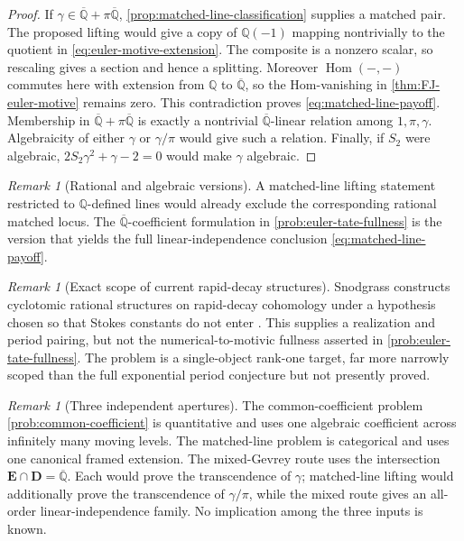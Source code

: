 \documentclass[11pt]{article}
\theoremstyle{keio}
\theoremstyle{definition}
\theoremstyle{remark}
\newtheorem{remark}[theorem]{Remark}
\newcommand{\Q}{\mathbb Q}
\newcommand{\Qbar}{\overline{\mathbb Q}}
\begin{document}
\begin{proof}
If \(\gamma\in\Qbar+\pi\Qbar\),
\cref{prop:matched-line-classification} supplies a matched pair.  The
proposed lifting would give a copy of \(\Q(-1)\) mapping nontrivially to the quotient
in \eqref{eq:euler-motive-extension}.  The composite is a nonzero scalar,
so rescaling gives a section and hence a splitting.  Moreover
\(\operatorname{Hom}(-,-)\) commutes here with extension from \(\Q\) to
\(\Qbar\), so the Hom-vanishing in \cref{thm:FJ-euler-motive} remains
zero.  This contradiction proves \eqref{eq:matched-line-payoff}.  Membership
in \(\Qbar+\pi\Qbar\) is exactly a nontrivial \(\Qbar\)-linear relation
among \(1,\pi,\gamma\).  Algebraicity of either \(\gamma\) or
\(\gamma/\pi\) would give such a relation.  Finally, if \(S_2\) were
algebraic, \(2S_2\gamma^2+\gamma-2=0\) would make \(\gamma\) algebraic.
\end{proof}

\begin{remark}[Rational and algebraic versions]
A matched-line lifting statement restricted to \(\Q\)-defined lines would
already exclude the corresponding rational matched locus.  The
\(\Qbar\)-coefficient formulation in \cref{prob:euler-tate-fullness} is the
version that yields the full linear-independence conclusion
\eqref{eq:matched-line-payoff}.
\end{remark}

\begin{remark}[Exact scope of current rapid-decay structures]
Snodgrass constructs cyclotomic rational structures on rapid-decay
cohomology under a hypothesis chosen so that Stokes constants do not enter
\cite[\S1.2]{Snodgrass2026}.  This supplies a realization and period pairing,
but not the numerical-to-motivic fullness asserted in
\cref{prob:euler-tate-fullness}.  The problem is a single-object rank-one
target, far more narrowly scoped than the full exponential period conjecture
but not presently proved.
\end{remark}

\begin{remark}[Three independent apertures]
The common-coefficient problem \cref{prob:common-coefficient} is quantitative
and uses one algebraic coefficient across infinitely many moving levels.
The matched-line problem is categorical and uses one canonical framed
extension.  The mixed-Gevrey route uses the intersection
\(\mathbf E\cap\mathbf D=\Qbar\).  Each would prove the transcendence of
\(\gamma\); matched-line lifting would additionally prove the
transcendence of \(\gamma/\pi\), while the mixed route gives an all-order
linear-independence family.  No implication among the three inputs is known.
\end{remark}
\end{document}
